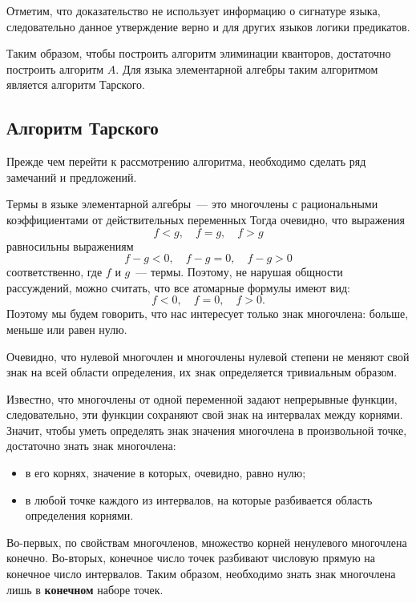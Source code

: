Отметим, что доказательство не использует информацию о сигнатуре языка, следовательно данное утверждение верно и для других языков логики предикатов.

Таким образом, чтобы построить алгоритм элиминации кванторов, достаточно построить алгоритм $A$. Для языка элементарной алгебры таким алгоритмом является алгоритм Тарского.

\subsection{Алгоритм Тарского}

Прежде чем перейти к рассмотрению алгоритма, необходимо сделать ряд замечаний и предложений.

Термы в языке элементарной алгебры~--- это многочлены с рациональными коэффициентами от действительных переменных Тогда очевидно, что выражения
\begin{equation*}
    f < g, \quad f = g, \quad f > g
\end{equation*}
равносильны выражениям
\begin{equation*}
    f - g < 0, \quad f - g = 0, \quad f - g > 0 
\end{equation*}
соответственно, где $f$ и $g$~--- термы. Поэтому, не нарушая общности рассуждений, можно считать, что все атомарные формулы имеют вид:
\begin{equation*}
    f < 0, \quad f = 0, \quad f > 0.
\end{equation*}
Поэтому мы будем говорить, что нас интересует только знак многочлена: больше, меньше или равен нулю.

Очевидно, что нулевой многочлен и многочлены нулевой степени не меняют свой знак на всей области определения, их знак определяется тривиальным образом.

Известно, что многочлены от одной переменной задают непрерывные функции, следовательно, эти функции сохраняют свой знак на интервалах между корнями. Значит, чтобы уметь определять знак значения многочлена в произвольной точке, достаточно знать знак многочлена:
\begin{itemize}
    \item в его корнях, значение в которых, очевидно, равно нулю;
    \item в любой точке каждого из интервалов, на которые разбивается область определения корнями. 
\end{itemize}

Во-первых, по свойствам многочленов, множество корней ненулевого многочлена конечно. Во-вторых, конечное число точек разбивают числовую прямую на конечное число интервалов. Таким образом, необходимо знать знак многочлена лишь в \textbf{конечном} наборе точек.

